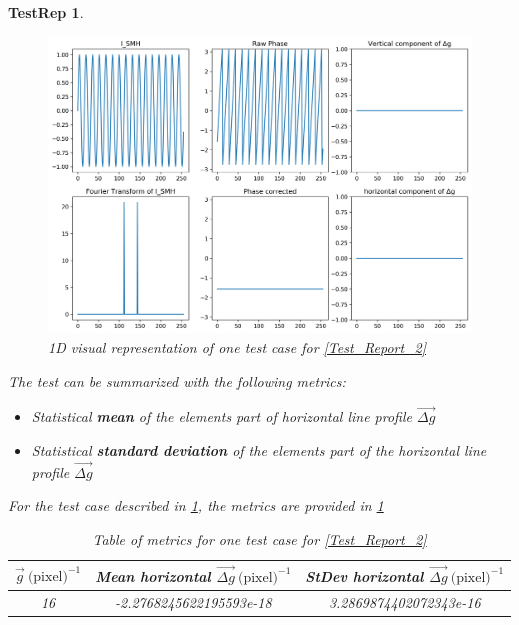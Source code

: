 \documentclass[12pt, titlepage]{article}
\newtheorem{TestRep}{TestRep}
\begin{document}
\begin{TestRep}
\begin{figure}[H]
\begin{center}
\includegraphics[scale=0.5]{Figures/Test_2_explanation_1D.png}
\caption{1D visual representation of one test case for \cref{Test_Report_2}}
\label{fig:Test_2_explaination_1D}
\end{center}
\end{figure}

The test can be summarized with the following metrics:
\begin{itemize}
\item Statistical \textbf{mean} of the elements part of horizontal line profile $\overrightarrow{\Delta g}$
\item Statistical \textbf{standard deviation} of the elements part of the horizontal line profile $\overrightarrow{\Delta g}$
\end{itemize}

For the test case described in \cref{fig:Test_2_explaination_1D}, the metrics are provided in \cref{tb:Metric_test_2_single_case}

\begin{table}[H]
\centering
\begin{tabular}{|c|c|c|}
\hline
$\overrightarrow{g} \ \text{(pixel)}^{-1}$ & Mean horizontal $\overrightarrow{\Delta g} \ \text{(pixel)}^{-1}$ & StDev horizontal $\overrightarrow{\Delta g} \ \text{(pixel)}^{-1}$ \\
\hline
16			& -2.2768245622195593e-18 & 3.2869874402072343e-16 \\ \hline
\end{tabular}
\caption{Table of metrics for one test case for \cref{Test_Report_2}}\label{tb:Metric_test_2_single_case}
\end{table}


\end{TestRep}
\end{document}

